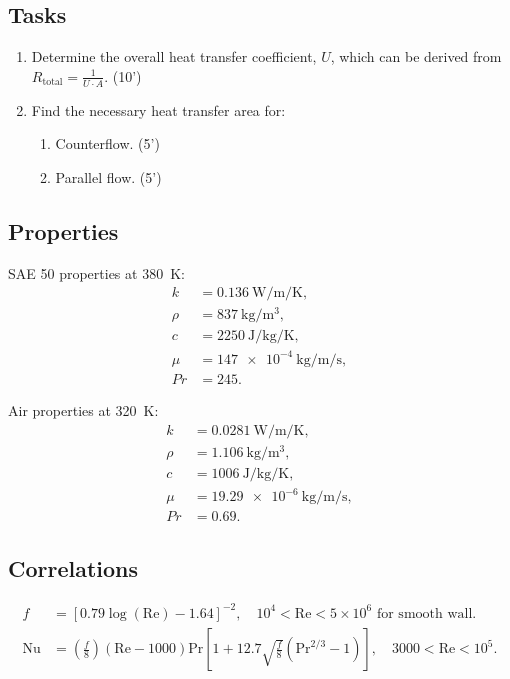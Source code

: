 \documentclass{article}
\begin{document}
\subsection*{Tasks}
\begin{enumerate}
    \item Determine the overall heat transfer coefficient, \( U \), which can be derived from \( R_{\text{total}} = \frac{1}{U \cdot A} \). (10')
    \item Find the necessary heat transfer area for:
    \begin{enumerate}
        \item Counterflow. (5')
        \item Parallel flow. (5')
    \end{enumerate}
\end{enumerate}

\subsection*{Properties}
SAE 50 properties at \SI{380}{\kelvin}:
\begin{align*}
    k & = \SI{0.136}{\watt\per\meter\per\kelvin}, \\
    \rho & = \SI{837}{\kilogram\per\meter\cubed}, \\
    c & = \SI{2250}{\joule\per\kilogram\per\kelvin}, \\
    \mu & = \SI{147e-4}{\kilogram\per\meter\per\second}, \\
    Pr & = 245.
\end{align*}

Air properties at \SI{320}{\kelvin}:
\begin{align*}
    k & = \SI{0.0281}{\watt\per\meter\per\kelvin}, \\
    \rho & = \SI{1.106}{\kilogram\per\meter\cubed}, \\
    c & = \SI{1006}{\joule\per\kilogram\per\kelvin}, \\
    \mu & = \SI{19.29e-6}{\kilogram\per\meter\per\second}, \\
    Pr & = 0.69.
\end{align*}

\subsection*{Correlations}
\begin{align*}
    f & = \left[0.79 \log(\text{Re}) - 1.64\right]^{-2}, \quad 10^4 < \text{Re} < 5 \times 10^6 \text{ for smooth wall.} \\
    \text{Nu} & = \left(\frac{f}{8}\right)(\text{Re} - 1000) \text{Pr} \left[1 + 12.7 \sqrt{\frac{f}{8}} \left(\text{Pr}^{2/3} - 1\right)\right], \quad 3000 < \text{Re} < 10^5.
\end{align*}
\end{document}
